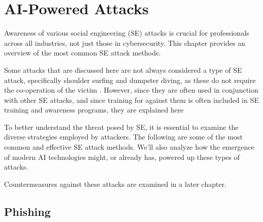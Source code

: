 


\chapter{AI-Powered Attacks\label{methods}}

Awareness of various social engineering (SE) attacks is crucial for professionals across all industries, not just those in cybersecurity. This chapter provides an overview of the most common SE attack methods.


Some attacks that are discussed here are not always considered a type of SE attack, specifically shoulder surfing and dumpster diving, as these do not require the co-operation of the victim \citep{wang_defining_2020}. However, since they are often used in conjunction with other SE attacks, and since training for against them is often included in SE training and awareness programs, they are explained here


To better understand the threat posed by SE, it is essential to examine the diverse strategies employed by attackers. The following are some of the most common and effective SE attack methods. We'll also analyze how the emergence of modern AI technologies might, or already has, powered up these types of attacks.

Countermeasures against these attacks are examined in a later chapter.










\section{Phishing}

